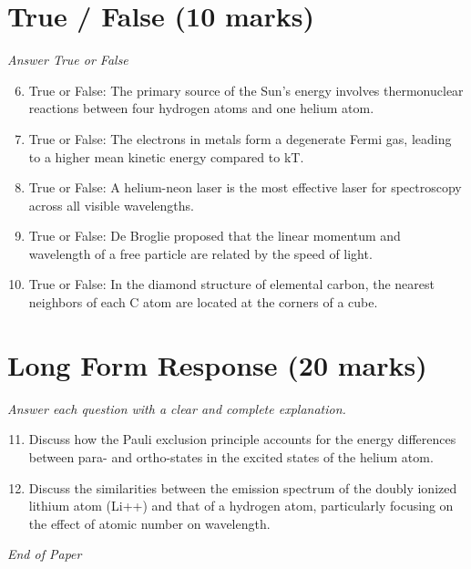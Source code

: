 \documentclass[12pt]{article}
\begin{document}
\section*{True / False (10 marks)}
\textit{Answer True or False}
\begin{enumerate}[label=\arabic*.]
\setcounter{enumi}{5}
\item True or False: The primary source of the Sun's energy involves thermonuclear reactions between four hydrogen atoms and one helium atom.
\item True or False: The electrons in metals form a degenerate Fermi gas, leading to a higher mean kinetic energy compared to kT.
\item True or False: A helium-neon laser is the most effective laser for spectroscopy across all visible wavelengths.
\item True or False: De Broglie proposed that the linear momentum and wavelength of a free particle are related by the speed of light.
\item True or False: In the diamond structure of elemental carbon, the nearest neighbors of each C atom are located at the corners of a cube.
\end{enumerate}

\section*{Long Form Response (20 marks)}
\textit{Answer each question with a clear and complete explanation.}
\begin{enumerate}[label=\arabic*.]
\setcounter{enumi}{10}
\item Discuss how the Pauli exclusion principle accounts for the energy differences between para- and ortho-states in the excited states of the helium atom.
\item Discuss the similarities between the emission spectrum of the doubly ionized lithium atom (Li++) and that of a hydrogen atom, particularly focusing on the effect of atomic number on wavelength.
\end{enumerate}

\vfill
\noindent\textit{End of Paper}
\end{document}
